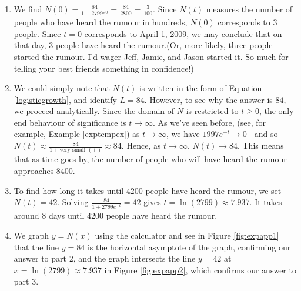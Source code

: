 {
\begin{enumerate}

\item  We find $N(0) = \frac{84}{1+2799e^{0}} = \frac{84}{2800} = \frac{3}{100}$.  Since $N(t)$ measures the number of people who have heard the rumour in hundreds, $N(0)$ corresponds to $3$ people.  Since $t=0$ corresponds to April 1, 2009, we may conclude that on that day, $3$ people have heard the rumour.(Or, more likely, three people started the rumour.  I'd wager Jeff, Jamie, and Jason started it.  So much for telling your best friends something in confidence!)

\item  We could simply note that $N(t)$ is written in the form of Equation \ref{logisticgrowth}, and identify $L = 84$.  However, to see why the answer is $84$, we proceed analytically.  Since the domain of $N$ is restricted to $t \geq 0$, the only end behaviour of significance is $t \rightarrow \infty$. As we've seen before, (see, for example, Example \ref{exptempex}) as $t \rightarrow \infty$, we have $1997 e^{-t} \rightarrow 0^{+}$ and so $N(t) \approx \frac{84}{1 + \mbox{very small $(+)$}} \approx 84$.  Hence, as $t \rightarrow \infty$, $N(t) \rightarrow 84$.   This means that as time goes by, the number of people who will have heard the rumour approaches $8400$. 

\item  To find how long it takes until $4200$ people have heard the rumour, we set $N(t) = 42$.  Solving $\frac{84}{1+2799e^{-t}} = 42$ gives $t =  \ln(2799) \approx 7.937$.  It takes around $8$ days until $4200$ people have heard the rumour.

\item  We graph $y=N(x)$ using the calculator and see in Figure \ref{fig:expapp1} that the line $y=84$ is the horizontal asymptote of the graph, confirming our answer to part 2, and the graph intersects the line $y=42$ at $x = \ln(2799) \approx 7.937$ in Figure \ref{fig:expapp2}, which confirms our answer to part 3.

{}

{}


\end{enumerate}
}


